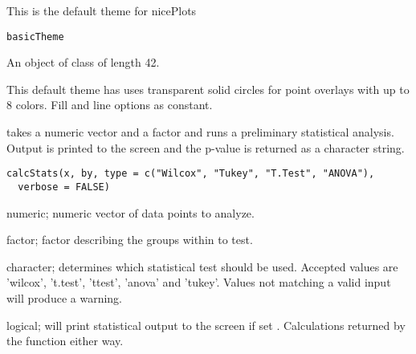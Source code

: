 \documentclass[a4paper]{book}
\begin{document}
%
\begin{Description}\relax
This is the default theme for nicePlots
\end{Description}
%
\begin{Usage}
\begin{verbatim}
basicTheme
\end{verbatim}
\end{Usage}
%
\begin{Format}
An object of class  of length 42.
\end{Format}
%
\begin{Details}\relax
This default theme has uses transparent solid circles for point overlays with up to 8 colors.
Fill and line options as constant.
\end{Details}
%
\begin{Description}\relax
{} takes a numeric vector and a factor and runs a preliminary statistical analysis. Output is printed to the screen and the p-value is returned as a character string.
\end{Description}
%
\begin{Usage}
\begin{verbatim}
calcStats(x, by, type = c("Wilcox", "Tukey", "T.Test", "ANOVA"),
  verbose = FALSE)
\end{verbatim}
\end{Usage}
%
\begin{Arguments}
\begin{ldescription}
\item[\code{x}] numeric; numeric vector of data points to analyze.

\item[\code{by}] factor; factor describing the groups within  to test.

\item[\code{type}] character; determines which statistical test should be used. Accepted values are 'wilcox', 't.test', 'ttest', 'anova' and 'tukey'. Values not matching a valid input will produce a warning.

\item[\code{verbose}] logical; will print statistical output to the screen if set . Calculations returned by the function either way.
\end{ldescription}
\end{Arguments}
\end{document}
